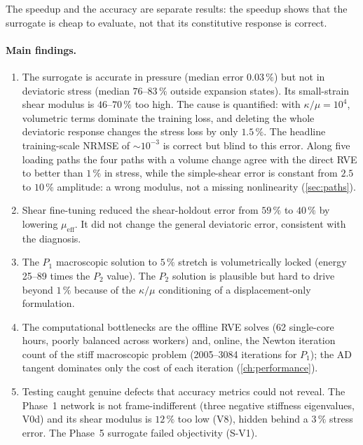 The speedup and the accuracy are separate results: the speedup shows that the
surrogate is cheap to evaluate, not that its constitutive response is correct.

\paragraph{Main findings.}
\begin{enumerate}
  \item The surrogate is accurate in pressure (median error $0.03\,\%$) but not in
        deviatoric stress (median $76$--$83\,\%$ outside expansion states). Its small-strain shear modulus is
        $46$--$70\,\%$ too high. The cause is quantified: with $\kappa/\mu=10^4$,
        volumetric terms dominate the training loss, and deleting the whole
        deviatoric response changes the stress loss by only $1.5\,\%$. The headline
        training-scale NRMSE of $\sim10^{-3}$ is correct but blind to this error.
        Along five loading paths the four paths with a volume change agree with the
        direct RVE to better than $1\,\%$ in stress, while the simple-shear error is
        constant from $2.5$ to $10\,\%$ amplitude: a wrong modulus, not a missing
        nonlinearity (\cref{sec:paths}).
  \item Shear fine-tuning reduced the shear-holdout error from $59\,\%$ to $40\,\%$ by
        lowering $\mu_{\mathrm{eff}}$. It did not change the general deviatoric
        error, consistent with the diagnosis.
  \item The $P_1$ macroscopic solution to $5\,\%$ stretch is volumetrically locked
        (energy 25--89 times the $P_2$ value). The $P_2$ solution is plausible but
        hard to drive beyond $1\,\%$ because of the $\kappa/\mu$ conditioning of a
        displacement-only formulation.
  \item The computational bottlenecks are the offline RVE solves (62 single-core
        hours, poorly balanced across workers) and, online, the Newton iteration
        count of the stiff macroscopic problem (2005--3084 iterations for $P_1$); the
        AD tangent dominates only the cost of each iteration (\cref{ch:performance}).
  \item Testing caught genuine defects that accuracy metrics could not reveal. The
        Phase~1 network is not frame-indifferent (three negative stiffness
        eigenvalues, V0d) and its shear modulus is $12\,\%$ too low (V8), hidden behind a
        $3\,\%$ stress error. The Phase~5 surrogate failed objectivity (S-V1).
\end{enumerate}


